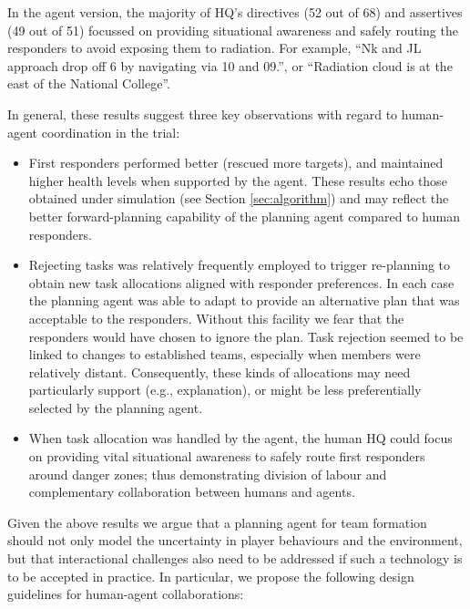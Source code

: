 In the agent version, the majority of HQ's directives (52 out of 68) and assertives (49 out of 51) focussed on providing situational awareness and safely routing the responders to avoid exposing them to radiation. For example, ``Nk and JL approach drop off 6 by navigating via 10 and 09.'', or ``Radiation cloud is at the east of the National College''. 

In general, these results suggest three key observations with regard to  human-agent coordination in the trial:
\begin{itemize}
\item First responders performed better (rescued more targets), and maintained higher health levels when supported by the agent.  These results echo those obtained under simulation (see Section \ref{sec:algorithm}) and  may reflect the better forward-planning capability of the planning agent compared to human responders. 
 
\item Rejecting tasks was relatively frequently employed to trigger re-planning to obtain new task allocations aligned with responder preferences.  In each case the planning agent was able to adapt to provide an alternative plan that was acceptable to the responders. Without this facility we fear that the responders would have chosen to ignore the plan. Task rejection seemed to be linked to changes to established teams, especially when members were relatively distant. Consequently, these kinds of allocations may need particularly support (e.g., explanation), or might be less preferentially selected by the planning agent.

\item When task allocation was handled by the agent, the human HQ could focus on providing vital situational awareness to safely route first responders around danger zones; thus demonstrating division of labour and complementary collaboration between humans and agents.
\end{itemize}

Given the above results we argue that a planning agent for team formation should not only model the uncertainty in player behaviours and the environment, but that interactional challenges also need to be addressed  if such a technology is to be accepted in practice. In particular, we propose the following design guidelines for human-agent collaborations:\\

